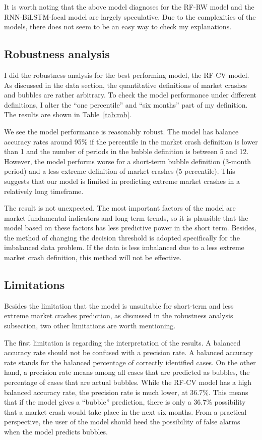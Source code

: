 \documentclass[12pt, man, a4paper, floatsintext]{apa7}
\begin{document}
It is worth noting that the above model diagnoses for the RF-RW model and the RNN-BiLSTM-focal model are largely speculative. Due to the complexities of the models, there does not seem to be an easy way to check my explanations.

\subsection{Robustness analysis}

I did the robustness analysis for the best performing model, the RF-CV model. As discussed in the data section, the quantitative definitions of market crashes and bubbles are rather arbitrary. To check the model performance under different definitions, I alter the “one percentile” and “six months” part of my definition. The results are shown in Table~\ref{tab:rob}.



We see the model performance is reasonably robust. The model has balance accuracy rates around 95\% if the percentile in the market crash definition is lower than 1 and the number of periods in the bubble definition is between 5 and 12. However, the model performs worse for a short-term bubble definition (3-month period) and a less extreme definition of market crashes (5 percentile). This suggests that our model is limited in predicting extreme market crashes in a relatively long timeframe. 

The result is not unexpected. The most important factors of the model are market fundamental indicators and long-term trends, so it is plausible that the model based on these factors has less predictive power in the short term. Besides, the method of changing the decision threshold is adopted specifically for the imbalanced data problem. If the data is less imbalanced due to a less extreme market crash definition, this method will not be effective.

\subsection{Limitations}

Besides the limitation that the model is unsuitable for short-term and less extreme market crashes prediction, as discussed in the robustness analysis subsection, two other limitations are worth mentioning.

The first limitation is regarding the interpretation of the results. A balanced accuracy rate should not be confused with a precision rate. A balanced accuracy rate stands for the balanced percentage of correctly identified cases. On the other hand, a precision rate means among all cases that are predicted as bubbles, the percentage of cases that are actual bubbles. While the RF-CV model has a high balanced accuracy rate, the precision rate is much lower, at 36.7\%. This means that if the model gives a “bubble” prediction, there is only a 36.7\% possibility that a market crash would take place in the next six months. From a practical perspective, the user of the model should heed the possibility of false alarms when the model predicts bubbles.
\end{document}
